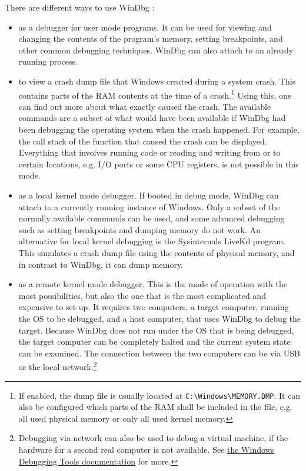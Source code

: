 There are different ways to use WinDbg \cite{Yosifovich2017}:
\begin{itemize}
	\item as a debugger for user mode programs. It can be used for viewing and changing the contents of the program's memory, setting breakpoints, and other common debugging techniques. WinDbg can also attach to an already running process.
	\item to view a crash dump file that Windows created during a system crash. This contains parts of the RAM contents at the time of a crash.\footnote{\label{fn:background.kerneldriver.crashdump} If enabled, the dump file is usually located at \texttt{C:\textbackslash Windows\textbackslash MEMORY.DMP}. It can also be configured which parts of the RAM shall be included in the file, e.g. all used physical memory or only all used kernel memory.} Using this, one can find out more about what exactly caused the crash. The available commands are a subset of what would have been available if WinDbg had been debugging the operating system when the crash happened. For example, the call stack of the function that caused the crash can be displayed. Everything that involves running code or reading and writing from or to certain locations, e.g. I/O ports or some CPU registers, is not possible in this mode.
	\item as a local kernel mode debugger. If booted in debug mode, WinDbg can attach to a currently running instance of Windows. Only a subset of the normally available commands can be used, and some advanced debugging such as setting breakpoints and dumping memory do not work. An alternative for local kernel debugging is the Sysinternals LiveKd program. This simulates a crash dump file using the contents of physical memory, and in contrast to WinDbg, it can dump memory.
	\item as a remote kernel mode debugger. This is the mode of operation with the most possibilities, but also the one that is the most complicated and expensive to set up. It requires two computers, a target computer, running the OS to be debugged, and a host computer, that uses WinDbg to debug the target. Because WinDbg does not run under the OS that is being debugged, the target computer can be completely halted and the current system state can be examined. The connection between the two computers can be via USB or the local network.\footnote{\label{background.kerneldriver.vmdebugging} Debugging via network can also be used to debug a virtual machine, if the hardware for a second real computer is not available. See \href{https://docs.microsoft.com/en-us/windows-hardware/drivers/debugger/setting-up-network-debugging-of-a-virtual-machine-host}{the Windows Debugging Tools documentation} for more.}
\end{itemize}

